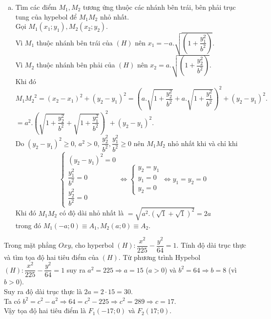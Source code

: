 \begin{bt}
{\begin{enumerate}[a)]
(vì $M(x;y)$ thuộc nhánh bên phải trục tung của $(H)$ nên $x>0$.)\\
Hơn nữa, ta có $\sqrt{\left( 1+ \dfrac{y^{2}}{b^{2}} \right)} \geq 1$ nên $a.\sqrt{\left( 1+ \dfrac{y^{2}}{b^{2}} \right)} \geq a$ hay $x \geq a$.\\
\item Tìm các điểm $M_{1}, M_{2}$ tương ứng thuộc các nhánh bên trái, bên phải trục tung của hypebol để $M_{1} M_{2}$ nhỏ nhất.\\
Gọi $M_1(x_1;y_1), M_2(x_2;y_2)$.\\
Vì $M_1$ thuộc nhánh bên trái của $(H)$ nên $x_1=-a.\sqrt{\left( 1+ \dfrac{y_1^{2}}{b^{2}} \right)}.$\\
Vì $M_2$ thuộc nhánh bên phải của $(H)$ nên $x_2=a.\sqrt{\left( 1+ \dfrac{y_2^{2}}{b^{2}} \right)}.$\\
Khi đó ${M_1M_2}^2= (x_2-x_1)^2+(y_2-y_1)^2=\left( a.\sqrt{1+ \dfrac{y_2^{2}}{b^{2}}} + a.\sqrt{1+ \dfrac{y_1^{2}}{b^{2}}}\right)^2+(y_2-y_1)^2.$\\
$=a^2.\left( \sqrt{1+ \dfrac{y_2^{2}}{b^{2}}} + \sqrt{1+ \dfrac{y_1^{2}}{b^{2}}}\right)^2+(y_2-y_1)^2$.\\
Do $(y_2-y_1)^2 \geq 0$, $a^2>0$, $\dfrac{y_2^{2}}{b^{2}}, \dfrac{y_1^{2}}{b^{2}} \geq 0$ nên ${M_1M_2}$ nhỏ nhất khi và chỉ khi \[\left\{ {\begin{array}{*{20}{c}}
  {{{({y_2} - {y_1})}^2} = 0} \\ 
  {\dfrac{{y_1^2}}{{{b^2}}} = 0} \\ 
  {\dfrac{{y_2^2}}{{{b^2}}} = 0} 
\end{array}} \right. \Leftrightarrow \left\{ {\begin{array}{*{20}{c}}
  {{y_2} = {y_1}} \\ 
  {{y_1} = 0} \\ 
  {{y_2} = 0} 
\end{array}} \right. \Leftrightarrow {y_1} = {y_2} = 0\]
Khi đó $M_1M_2$ có độ dài nhỏ nhất là $=\sqrt{a^2.\left( \sqrt{1} + \sqrt{1}\right)^2}=2a$\\
trong đó $M_1(-a;0) \equiv A_1 , M_2(a;0) \equiv A_2.$
\end{enumerate}
}
\end{bt}

\begin{bt}%
	Trong mặt phẳng $Oxy$, cho hyperbol $(H)\colon \dfrac{x^2}{225}-\dfrac{y^2}{64}=1$. Tính độ dài trục thực và tìm tọa độ hai tiêu điểm của $(H)$.
	\loigiai
	{
		Từ phương trình Hypebol $\left(H\right):\dfrac{x^2}{225}-\dfrac{y^2}{64}=1$ suy ra
		$a^2=225\Rightarrow a=15$ ($a>0$) và $b^2=64\Rightarrow b=8$ (vì $b>0$).\\
		Suy ra độ dài trục thực là $2a=2\cdot15=30$.\\
		Ta có $b^2=c^2-a^2\Rightarrow 64=c^2-225\Rightarrow c^2=289\Rightarrow c=17$.\\
		Vậy tọa độ hai tiêu điểm là $F_1\left(-17;0\right)$ và $F_2\left(17;0\right)$.
	}
\end{bt}

